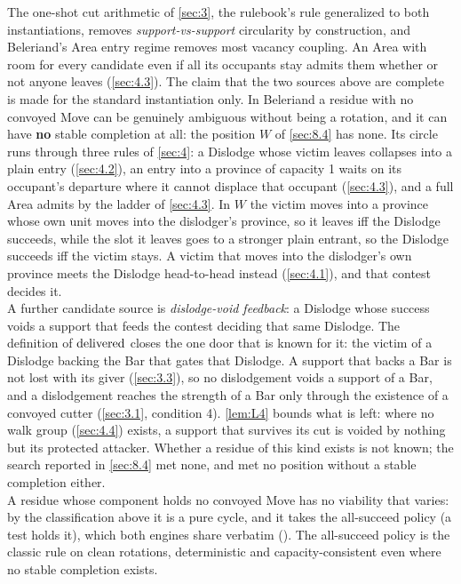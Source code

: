 \documentclass[12pt,a4paper]{article}
\begin{document}
The one-shot cut arithmetic of \cref{sec:3}, the rulebook's rule generalized to both instantiations, removes \emph{support-vs-support} circularity by construction, and Beleriand's Area entry regime removes most vacancy coupling.
An Area with room for every candidate even if all its occupants stay admits them whether or not anyone leaves (\cref{sec:4.3}).
The claim that the two sources above are complete is made for the standard instantiation only.
In Beleriand a residue with no convoyed Move can be genuinely ambiguous without being a rotation, and it can have \textbf{no} stable completion at all: the position $W$ of \cref{sec:8.4} has none.
Its circle runs through three rules of \cref{sec:4}: a Dislodge whose victim leaves collapses into a plain entry (\cref{sec:4.2}), an entry into a province of capacity 1 waits on its occupant's departure where it cannot displace that occupant (\cref{sec:4.3}), and a full Area admits by the ladder of \cref{sec:4.3}.
In $W$ the victim moves into a province whose own unit moves into the dislodger's province, so it leaves iff the Dislodge succeeds, while the slot it leaves goes to a stronger plain entrant, so the Dislodge succeeds iff the victim stays.
A victim that moves into the dislodger's own province meets the Dislodge head-to-head instead (\cref{sec:4.1}), and that contest decides it.\\
A further candidate source is \emph{dislodge-void feedback}: a Dislodge whose success voids a support that feeds the contest deciding that same Dislodge.
The definition of $\operatorname{delivered}$ closes the one door that is known for it: the victim of a Dislodge backing the Bar that gates that Dislodge.
A support that backs a Bar is not lost with its giver (\cref{sec:3.3}), so no dislodgement voids a support of a Bar, and a dislodgement reaches the strength of a Bar only through the existence of a convoyed cutter (\cref{sec:3.1}, condition 4).
\cref{lem:L4} bounds what is left: where no walk group (\cref{sec:4.4}) exists, a support that survives its cut is voided by nothing but its protected attacker.
Whether a residue of this kind exists is not known; the search reported in \cref{sec:8.4} met none, and met no position without a stable completion either.\\
A residue whose component holds no convoyed Move has no viability that varies: by the classification above it is a pure cycle, and it takes the all-succeed policy (a test holds it), which both engines share verbatim ().
The all-succeed policy is the classic rule on clean rotations, deterministic and capacity-consistent even where no stable completion exists.
\end{document}
